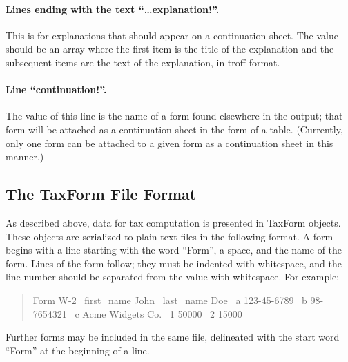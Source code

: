 \documentclass[12pt]{article}
\begin{document}
\paragraph{Lines ending with the text ``\ldots explanation!''.} This is for
explanations that should appear on a continuation sheet. The value should be an
array where the first item is the title of the explanation and the subsequent
items are the text of the explanation, in troff format.

\paragraph{Line ``continuation!''.} The value of this line is the name of a form
found elsewhere in the output; that form will be attached as a continuation
sheet in the form of a table. (Currently, only one form can be attached to a
given form as a continuation sheet in this manner.)



\subsection{The TaxForm File Format}

As described above, data for tax computation is presented in TaxForm objects.
These objects are serialized to plain text files in the following format.
A form begins with a line starting with the word ``Form'', a space, and the
name of the form. Lines of the form follow; they must be indented with
whitespace, and the line number should be separated from the value with
whitespace. For example:
\begin{quote}
\ttfamily\obeylines\obeyspaces
Form W-2
\     first\_name          John
\     last\_name           Doe
\     a                   123-45-6789
\     b                   98-7654321
\     c                   Acme Widgets Co.
\     1                   50000
\     2                   15000
\end{quote}
Further forms may be included in the same file, delineated with the start word
``Form'' at the beginning of a line.
\end{document}
